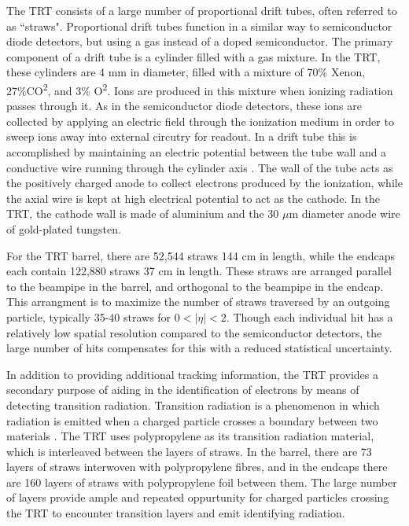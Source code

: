             The TRT consists of a large number of proportional drift tubes, often referred to as ``straws".
            Proportional drift tubes function in a similar way to semiconductor diode detectors, but using a gas instead of a doped semiconductor.
            The primary component of a drift tube is a cylinder filled with a gas mixture.
            In the TRT, these cylinders are 4 mm in diameter, filled with a mixture of 70\% Xenon, 27\%CO\textsuperscript{2}, and 3\% O\textsuperscript{2}.
            Ions are produced in this mixture when ionizing radiation passes through it.
            As in the semiconductor diode detectors, these ions are collected by applying an electric field through the ionization medium in order to sweep ions away into external circutry for readout.
            In a drift tube this is accomplished by maintaining an electric potential between the tube wall and a conductive wire running through the cylinder axis \cite{drift_chambers}.  %
            The wall of the tube acts as the positively charged anode to collect electrons produced by the ionization, while the axial wire is kept at high electrical potential to act as the cathode.
            In the TRT, the cathode wall is made of aluminium and the 30 $\mu$m diameter anode wire of gold-plated tungsten. \cite{trt_design}

            For the TRT barrel, there are 52,544 straws 144 cm in length, while the endcaps each contain 122,880 straws 37 cm in length.
            These straws are arranged parallel to the beampipe in the barrel, and orthogonal to the beampipe in the endcap. %
            This arrangment is to maximize the number of straws traversed by an outgoing particle, typically 35-40 straws for $0 < |\eta| < 2$.
            Though each individual hit has a relatively low spatial resolution compared to the semiconductor detectors, the large number of hits compensates for this with a reduced statistical uncertainty.

            In addition to providing additional tracking information, the TRT provides a secondary purpose of aiding in the identification of electrons by means of detecting transition radiation. 
            Transition radiation is a phenomenon in which radiation is emitted when a charged particle crosses a boundary between two materials \cite{transition_radiation}.
            The TRT uses polypropylene as its transition radiation material, which is interleaved between the layers of straws.
            In the barrel, there are 73 layers of straws interwoven with polypropylene fibres, and in the endcaps there are 160 layers of straws with polypropylene foil between them.
            The large number of layers provide ample and repeated oppurtunity for charged particles crossing the TRT to encounter transition layers and emit identifying radiation.

